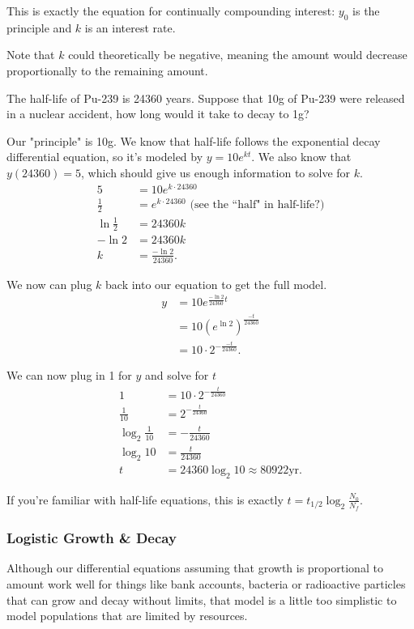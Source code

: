 This is exactly the equation for continually compounding interest: $y_0$ is the principle and $k$ is an interest rate.


Note that $k$ could theoretically be negative, meaning the amount would decrease proportionally to the remaining amount.
\begin{example}
	The half-life of Pu-239 is 24360 years.
	Suppose that 10g of Pu-239 were released in a nuclear accident, how long would it take to decay to 1g?
\end{example}
\begin{answer}
	Our "principle" is 10g.
	We know that half-life follows the exponential decay differential equation, so it's modeled by $y = 10e^{kt}$.
	We also know that $y(24360)=5$, which should give us enough information to solve for $k$.
	\begin{align*}
		5 &= 10e^{k\cdot 24360} \\
		\frac{1}{2} &= e^{k\cdot 24360} \text{ (see the ``half" in half-life?)} \\
		\ln{\frac{1}{2}} &= 24360k \\
		-\ln{2} &= 24360k \\
		k &= \frac{-\ln{2}}{24360}. 
	\end{align*}
	
	We now can plug $k$ back into our equation to get the full model.
	\begin{align*}
		y &= 10e^{\frac{-\ln{2}}{24360}t} \\
		&= 10\left(e^{\ln{2}}\right)^{\frac{-t}{24360}} \\
		&= 10\cdot2^{-\frac{-t}{24360}}.
	\end{align*}
	
	We can now plug in 1 for $y$ and solve for $t$
	\begin{align*}
		1 &= 10\cdot2^{-\frac{t}{24360}} \\
		\frac{1}{10} &= 2^{-\frac{t}{24360}} \\
		\log_{2}{\frac{1}{10}} &= -\frac{t}{24360} \\
		\log_{2}{10} &= \frac{t}{24360} \\
		t &= 24360\log_{2}{10} \approx 80922\text{yr}.
	\end{align*}
	
	If you're familiar with half-life equations, this is exactly $t=t_{1/2}\log_{2}{\frac{N_0}{N_f}}$.
\end{answer}

\subsubsection{Logistic Growth \& Decay}
Although our differential equations assuming that growth is proportional to amount work well for things like bank accounts, bacteria or radioactive particles that can grow and decay without limits, that model is a little too simplistic to model populations that are limited by resources.

